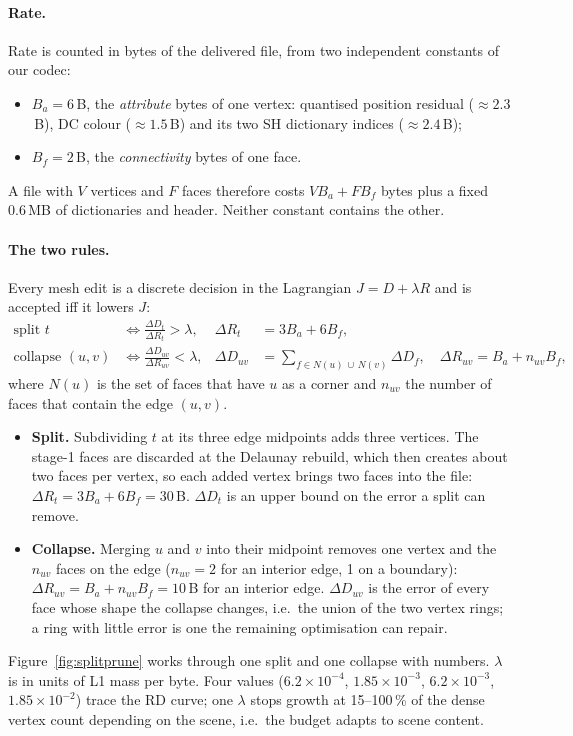 \documentclass[11pt,a4paper]{article}
\begin{document}
\paragraph{Rate.} Rate is counted in bytes of the delivered file, from two independent constants of our codec:
\begin{itemize}[nosep,leftmargin=*]
  \item $B_a = 6$\,B, the \emph{attribute} bytes of one vertex: quantised position residual ($\approx 2.3$\,B), DC colour ($\approx 1.5$\,B) and its two SH dictionary indices ($\approx 2.4$\,B);
  \item $B_f = 2$\,B, the \emph{connectivity} bytes of one face.
\end{itemize}
A file with $V$ vertices and $F$ faces therefore costs $V B_a + F B_f$ bytes plus a fixed 0.6\,MB of dictionaries and header. Neither constant contains the other.

\paragraph{The two rules.} Every mesh edit is a discrete decision in the Lagrangian $J = D + \lambda R$ and is accepted iff it lowers $J$:
\begin{align}
\text{split } t &\iff \frac{\Delta D_t}{\Delta R_t} > \lambda, & \Delta R_t &= 3B_a + 6B_f, \label{eq:split}\\
\text{collapse } (u,v) &\iff \frac{\Delta D_{uv}}{\Delta R_{uv}} < \lambda, & \Delta D_{uv} &= \sum_{f \in N(u)\,\cup\,N(v)} \Delta D_f, \quad \Delta R_{uv} = B_a + n_{uv} B_f , \label{eq:collapse}
\end{align}
where $N(u)$ is the set of faces that have $u$ as a corner and $n_{uv}$ the number of faces that contain the edge $(u,v)$.
\begin{itemize}[nosep,leftmargin=*]
  \item \textbf{Split.} Subdividing $t$ at its three edge midpoints adds three vertices. The stage-1 faces are discarded at the Delaunay rebuild, which then creates about two faces per vertex, so each added vertex brings two faces into the file: $\Delta R_t = 3B_a + 6B_f = 30$\,B. $\Delta D_t$ is an upper bound on the error a split can remove.
  \item \textbf{Collapse.} Merging $u$ and $v$ into their midpoint removes one vertex and the $n_{uv}$ faces on the edge ($n_{uv} = 2$ for an interior edge, 1 on a boundary): $\Delta R_{uv} = B_a + n_{uv}B_f = 10$\,B for an interior edge. $\Delta D_{uv}$ is the error of every face whose shape the collapse changes, i.e.\ the union of the two vertex rings; a ring with little error is one the remaining optimisation can repair.
\end{itemize}
Figure~\ref{fig:splitprune} works through one split and one collapse with numbers. $\lambda$ is in units of L1 mass per byte. Four values ($6.2\times10^{-4}$, $1.85\times10^{-3}$, $6.2\times10^{-3}$, $1.85\times10^{-2}$) trace the RD curve; one $\lambda$ stops growth at 15--100\,\% of the dense vertex count depending on the scene, i.e.\ the budget adapts to scene content.
\end{document}
